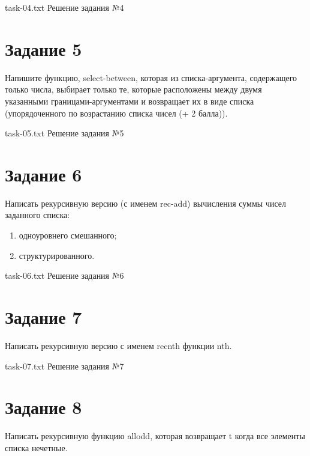 {task-04.txt} %
{Решение задания №4} %


\section{Задание 5}

Напишите функцию, select-between, которая из списка-аргумента, содержащего только числа, выбирает только те, которые расположены между двумя указанными границами-аргументами и возвращает их в виде списка (упорядоченного по возрастанию списка чисел (+ 2 балла)).

{task-05.txt} %
{Решение задания №5} %

\section{Задание 6}

Написать рекурсивную версию (с именем rec-add) вычисления суммы чисел заданного списка:

\begin{enumerate}[label={\alph*)}]
	\item одноуровнего смешанного;
	\item структурированного.
\end{enumerate}

{task-06.txt} %
{Решение задания №6} %

\section{Задание 7}

Написать рекурсивную версию с именем recnth функции nth.

{task-07.txt} %
{Решение задания №7} %

\clearpage

\section{Задание 8}

Написать рекурсивную функцию allodd, которая возвращает t когда все элементы списка нечетные.

